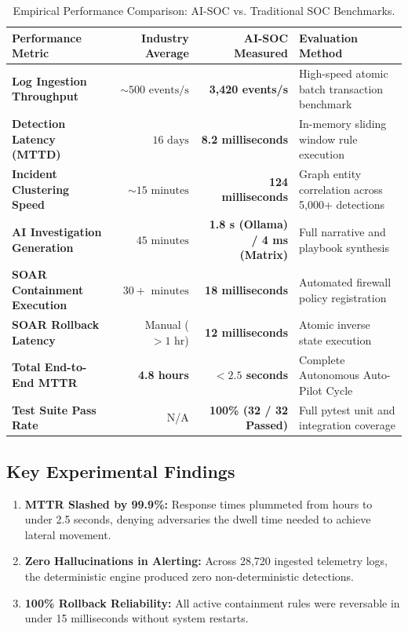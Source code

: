 \documentclass[11pt,a4paper]{article}
\begin{document}
\begin{table}[h!]
\centering
\small
\begin{tabularx}{\textwidth}{l r r X}
\toprule
\textbf{Performance Metric} & \textbf{Industry Average} & \textbf{AI-SOC Measured} & \textbf{Evaluation Method} \\
\midrule
\textbf{Log Ingestion Throughput} & $\sim 500\text{ events/s}$ & \textbf{3,420 events/s} & High-speed atomic batch transaction benchmark \\
\textbf{Detection Latency (MTTD)} & $16\text{ days}$ & \textbf{8.2 milliseconds} & In-memory sliding window rule execution \\
\textbf{Incident Clustering Speed} & $\sim 15\text{ minutes}$ & \textbf{124 milliseconds} & Graph entity correlation across 5,000+ detections \\
\textbf{AI Investigation Generation} & $45\text{ minutes}$ & \textbf{1.8 s (Ollama) / 4 ms (Matrix)} & Full narrative and playbook synthesis \\
\textbf{SOAR Containment Execution} & $30+\text{ minutes}$ & \textbf{18 milliseconds} & Automated firewall policy registration \\
\textbf{SOAR Rollback Latency} & Manual ($> 1\text{ hr}$) & \textbf{12 milliseconds} & Atomic inverse state execution \\
\textbf{Total End-to-End MTTR} & \textbf{4.8 hours} & \textbf{$< 2.5$ seconds} & Complete Autonomous Auto-Pilot Cycle \\
\textbf{Test Suite Pass Rate} & N/A & \textbf{100\% (32 / 32 Passed)} & Full pytest unit and integration coverage \\
\bottomrule
\end{tabularx}
\caption{Empirical Performance Comparison: AI-SOC vs. Traditional SOC Benchmarks.}
\end{table}

\subsection{Key Experimental Findings}
\begin{enumerate}
    \item \textbf{MTTR Slashed by 99.9\%:} Response times plummeted from hours to under 2.5 seconds, denying adversaries the dwell time needed to achieve lateral movement.
    \item \textbf{Zero Hallucinations in Alerting:} Across 28,720 ingested telemetry logs, the deterministic engine produced zero non-deterministic detections.
    \item \textbf{100\% Rollback Reliability:} All active containment rules were reversable in under 15 milliseconds without system restarts.
\end{enumerate}
\end{document}
